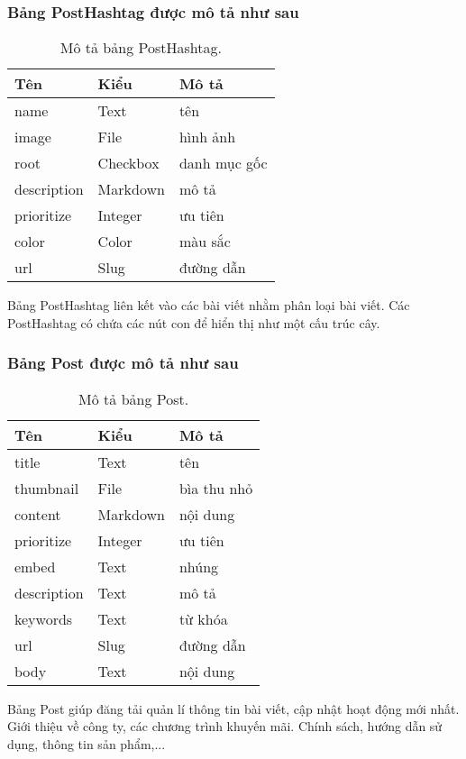 \subsubsection{Bảng PostHashtag được mô tả như sau}
\begin{table}[!htbp]\fontsize{13px}{13px}\selectfont\justifying
\begin{center}
\caption{Mô tả bảng PostHashtag.}
\begin{tabularx}{0.6\textwidth}{ |l|l|X| } 
\hline
Tên & Kiểu & Mô tả \\
\hline
name & Text & tên \\
image & File & hình ảnh \\
root & Checkbox & danh mục gốc \\
description & Markdown & mô tả \\
prioritize & Integer & ưu tiên \\
color & Color & màu sắc \\
url & Slug & đường dẫn \\ 
\hline
\end{tabularx}
\label{table:PostHashtag}
\end{center}
Bảng PostHashtag liên kết vào các bài viết nhằm phân loại bài viết. Các PostHashtag có chứa các nút con để hiển thị như một cấu trúc cây.
\end{table}

\subsubsection{Bảng Post được mô tả như sau}
\begin{table}[!htbp]\fontsize{13px}{13px}\selectfont\justifying
\begin{center}
\caption{Mô tả bảng Post.}
\begin{tabularx}{0.6\textwidth}{ |l|l|X| } 
\hline
Tên & Kiểu & Mô tả \\
\hline
title & Text & tên \\
thumbnail & File & bìa thu nhỏ \\
content & Markdown & nội dung \\
prioritize & Integer & ưu tiên \\
embed & Text & nhúng \\
description & Text & mô tả \\
keywords & Text & từ khóa \\
url & Slug & đường dẫn \\
body & Text & nội dung \\ 
\hline
\end{tabularx}
\label{table:Post}
\end{center}
Bảng Post giúp đăng tải quản lí thông tin bài viết, cập nhật hoạt động mới nhất. Giới thiệu về công ty, các chương trình khuyến mãi. Chính sách, hướng dẫn sử dụng, thông tin sản phẩm,...
\end{table}

